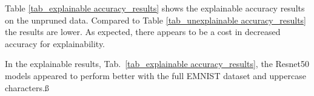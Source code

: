 \documentclass[conference]{IEEEtran}
\begin{document}
\begin{table}
    \centering
    \caption{Unexplainable accuracy results on various balanced EMNIST data sets with differing NN models}
    \label{tab_unexplainable accuracy_results}
\end{table}

Table \ref{tab_explainable accuracy_results} shows the explainable accuracy
results on the unpruned data. Compared to Table \ref{tab_unexplainable
accuracy_results} the results are lower.  As expected, there appears to be a
cost in decreased accuracy for explainability. %

In the explainable results, Tab.~\ref{tab_explainable accuracy_results}, the
Resnet50 models appeared to perform better with the full EMNIST dataset and
uppercase characters.ß
\end{document}
